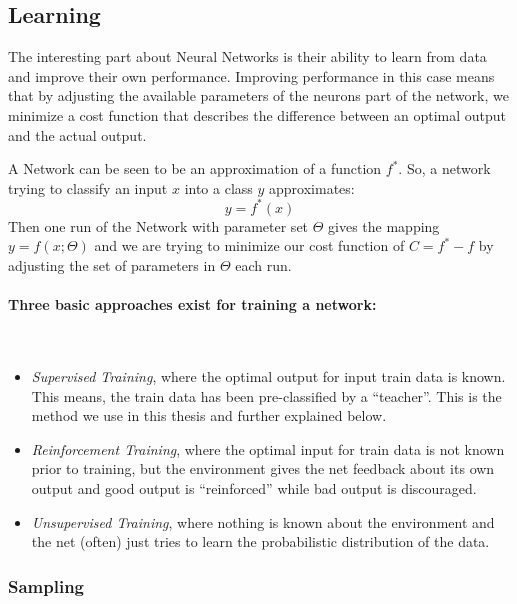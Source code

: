 \subsection{Learning}
\label{sec:fund:Learn}
The interesting part about Neural Networks is their ability to learn from data and improve their own performance. Improving performance in this case means that by adjusting the available parameters of the neurons part of the network, we minimize a cost function that describes the difference between an optimal output and the actual output. 

A Network can be seen to be an approximation of a function \(f^*\). So, a network trying to classify an input \(x\) into a class \(y\) approximates:
\begin{equation}
\label{eq:learn}
y=f^*(x)
\end{equation}
Then one run of the Network with parameter set \(\Theta\) gives the mapping \(y = f(x;\Theta)\) and we are trying to minimize our cost function of \(C= f^* - f\) by adjusting the set of parameters in \(\Theta\) each run.

\paragraph{Three basic approaches exist for training a network:} \hspace{0pt} \\
\begin{itemize}
\item \textit{Supervised Training}, where the optimal output for input train data is known. This means, the train data has been pre-classified by a ``teacher''. This is the method we use in this thesis and further explained below.
\item \textit{Reinforcement Training}, where the optimal input for train data is not known prior to training, but the environment gives the net feedback about its own output and good output is ``reinforced'' while bad output is discouraged.
\item \textit{Unsupervised Training}, where nothing is known about the environment and the net (often) just tries to learn the probabilistic distribution of the data.
\end{itemize}

\subsubsection{Sampling}
\label{sec:fund:Sampling}

